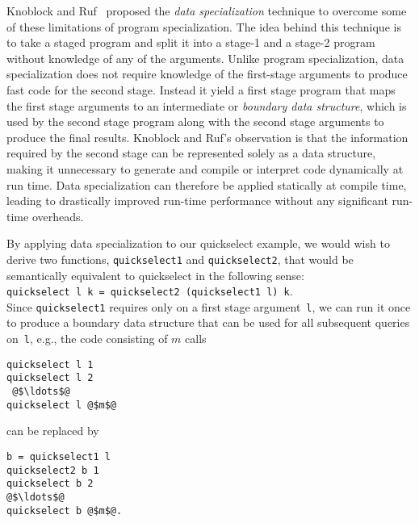 Knoblock and Ruf~\cite{KR} proposed the {\em data specialization}
technique to overcome some of these limitations of program
specialization.  The idea behind this technique is to take a staged
program and split it into a stage-1 and a stage-2 program without
knowledge of any of the arguments.  Unlike program specialization,
data specialization does not require knowledge of the first-stage
arguments to produce fast code for the second stage.  Instead it yield
a first stage program that maps the first stage arguments to an
intermediate or {\em boundary data structure}, which is used by the
second stage program along with the second stage arguments to produce
the final results.  Knoblock and Ruf's observation is that the
information required by the second stage can be represented solely as
a data structure, making it unnecessary to generate and compile or
interpret code dynamically at run time.  Data specialization can
therefore be applied statically at compile time, leading to
drastically improved run-time performance without any significant
run-time overheads.


By applying data specialization to our quickselect example, we would
wish to derive two functions, \texttt{quickselect1} and
\texttt{quickselect2}, that would be semantically equivalent to
quickselect in the following sense:
\\
\texttt{quickselect l k = quickselect2 (quickselect1 l) k}.
\\
%
Since \texttt{quickselect1} requires only on a first stage
argument~\texttt{l}, we can run it once to produce a boundary data
structure that can be used for all subsequent queries on~\texttt{l},
e.g.,  the code consisting of $m$ calls 
\begin{lstlisting}
quickselect l 1
quickselect l 2
 @$\ldots$@ 
quickselect l @$m$@
\end{lstlisting}
%
can be replaced by 
%
\begin{lstlisting}
b = quickselect1 l
quickselect2 b 1
quickselect b 2
@$\ldots$@ 
quickselect b @$m$@.
\end{lstlisting}

